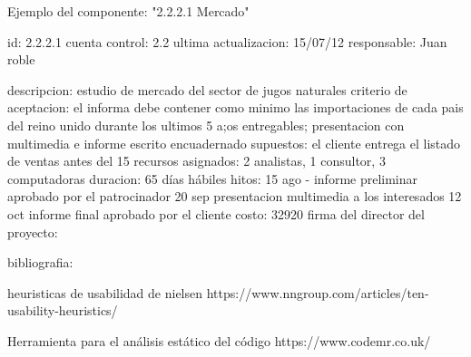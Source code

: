 Ejemplo del componente: "2.2.2.1 Mercado"

id: 2.2.2.1
cuenta control: 2.2
ultima actualizacion: 15/07/12
responsable: Juan roble

descripcion: estudio de mercado del sector de jugos naturales
criterio de aceptacion: el informa debe contener como minimo las importaciones de cada pais del reino unido durante los ultimos 5 a;os
entregables; presentacion con multimedia e informe escrito encuadernado
supuestos: el cliente entrega el listado de ventas antes del 15
recursos asignados: 2 analistas, 1 consultor, 3 computadoras
duracion: 65 días hábiles
hitos: 15 ago - informe preliminar aprobado por el patrocinador
20 sep presentacion multimedia a los interesados
12 oct informe final aprobado por el cliente
costo: 32920
firma del director del proyecto: 


bibliografia:

heuristicas de usabilidad de nielsen
https://www.nngroup.com/articles/ten-usability-heuristics/

Herramienta para el análisis estático del código
https://www.codemr.co.uk/